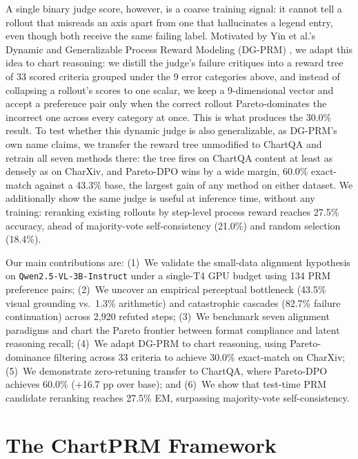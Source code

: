 \documentclass[11pt]{article}
\begin{document}
A single binary judge score, however, is a coarse training signal: it cannot tell a rollout that misreads an axis apart from one that hallucinates a legend entry, even though both receive the same failing label. Motivated by Yin et al.'s Dynamic and Generalizable Process Reward Modeling (DG-PRM) \citep{yin2024dgprm}, we adapt this idea to chart reasoning: we distill the judge's failure critiques into a reward tree of 33 scored criteria grouped under the 9 error categories above, and instead of collapsing a rollout's scores to one scalar, we keep a 9-dimensional vector and accept a preference pair only when the correct rollout Pareto-dominates the incorrect one across every category at once. This is what produces the 30.0\% result. To test whether this dynamic judge is also generalizable, as DG-PRM's own name claims, we transfer the reward tree unmodified to ChartQA and retrain all seven methods there: the tree fires on ChartQA content at least as densely as on CharXiv, and Pareto-DPO wins by a wide margin, 60.0\% exact-match against a 43.3\% base, the largest gain of any method on either dataset. We additionally show the same judge is useful at inference time, without any training: reranking existing rollouts by step-level process reward reaches 27.5\% accuracy, ahead of majority-vote self-consistency (21.0\%) and random selection (18.4\%).

Our main contributions are: (1)~We validate the small-data alignment hypothesis on \texttt{Qwen2.5-VL-3B-Instruct} under a single-T4 GPU budget using 134 PRM preference pairs; (2)~We uncover an empirical perceptual bottleneck (43.5\% visual grounding vs.\ 1.3\% arithmetic) and catastrophic cascades (82.7\% failure continuation) across 2,920 refuted steps; (3)~We benchmark seven alignment paradigms and chart the Pareto frontier between format compliance and latent reasoning recall; (4)~We adapt DG-PRM to chart reasoning, using Pareto-dominance filtering across 33 criteria to achieve 30.0\% exact-match on CharXiv; (5)~We demonstrate zero-retuning transfer to ChartQA, where Pareto-DPO achieves 60.0\% (+16.7 pp over base); and (6)~We show that test-time PRM candidate reranking reaches 27.5\% EM, surpassing majority-vote self-consistency.

\section{The ChartPRM Framework}
\label{sec:chartprm_framework}
\end{document}
